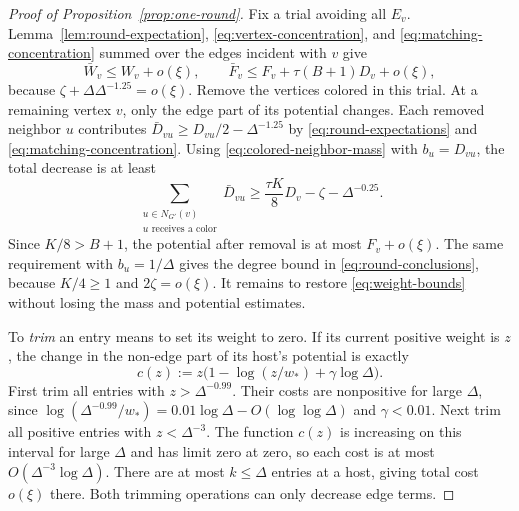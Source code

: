 \begin{proof}[Proof of Proposition~\ref{prop:one-round}]
Fix a trial avoiding all $E_v$.  Lemma~\ref{lem:round-expectation},
\eqref{eq:vertex-concentration}, and
\eqref{eq:matching-concentration} summed over the edges incident
with $v$ give
\begin{equation}\label{eq:provisional-bounds}
 \bar W_v\le W_v+o(\xi),\qquad
 \bar F_v\le F_v+\tau(B+1)D_v+o(\xi),
\end{equation}
because $\zeta+\Delta\Delta^{-1.25}=o(\xi)$.
Remove the vertices colored in this trial.  At a remaining vertex
$v$, only the edge part of its potential changes.  Each removed
neighbor $u$ contributes
$\bar D_{vu}\ge D_{vu}/2-\Delta^{-1.25}$ by
\eqref{eq:round-expectations} and
\eqref{eq:matching-concentration}.  Using
\eqref{eq:colored-neighbor-mass} with $b_u=D_{vu}$, the total
decrease is at least
\begin{equation}\label{eq:potential-removal-gain}
 \sum_{\substack{u\in N_{G'}(v)\\u\text{ receives a color}}}\bar D_{vu}
 \ge\frac{\tau K}{8}D_v-\zeta-\Delta^{-0.25}.
\end{equation}
Since $K/8>B+1$, the potential after removal is at most $F_v+o(\xi)$.
The same requirement with $b_u=1/\Delta$ gives the degree bound in
\eqref{eq:round-conclusions}, because $K/4\ge1$ and $2\zeta=o(\xi)$.
It remains to restore \eqref{eq:weight-bounds} without losing the
mass and potential estimates.

To \emph{trim} an entry means to set its weight to zero.  If its
current positive weight is $z$, the change in the non-edge part of
its host's potential is exactly
\begin{equation}\label{eq:trimming-cost}
 c(z):=z\bigl(1-\log(z/w_*)+\gamma\log\Delta\bigr).
\end{equation}
First trim all entries with $z>\Delta^{-0.99}$.  Their costs are
nonpositive for large $\Delta$, since
$\log(\Delta^{-0.99}/w_*)=0.01\log\Delta-O(\log\log\Delta)$ and
$\gamma<0.01$.  Next trim all positive entries with $z<\Delta^{-3}$.
The function $c(z)$ is increasing on this interval for large $\Delta$
and has limit zero at zero, so each cost is at most
$O(\Delta^{-3}\log\Delta)$.  There are at most $k\le\Delta$ entries
at a host, giving total cost $o(\xi)$ there.  Both trimming operations
can only decrease edge terms.


\end{proof}
